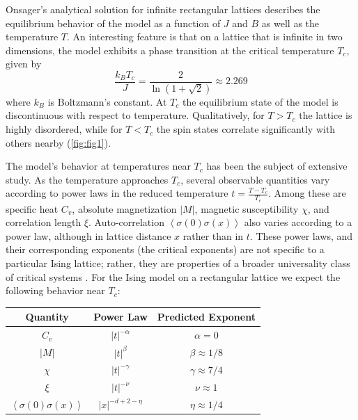 \documentclass[letter,scriptaddress,twocolumn, prl,nofootinbib]{revtex4}
\newcommand{\submin}[1]{\left\langle #1 \right\rangle}
\begin{document}
Onsager's analytical solution for infinite rectangular lattices \cite{Onsager} describes the equilibrium behavior of the model as a function of $J$ and $B$ as well as the temperature $T$. An interesting feature is that on a lattice that is infinite in two dimensions, the model exhibits a phase transition at the critical temperature $T_c$, given by
\begin{equation}
	\label{eq:Tc}
	\frac{k_B T_c}{J} = \frac{2}{\ln{(1+\sqrt{2})}} \approx 2.269
\end{equation}
where $k_B$ is Boltzmann's constant. At $T_c$ the equilibrium state of the model is discontinuous with respect to temperature. Qualitatively, for $T > T_c$ the lattice is highly disordered, while for $T < T_c$ the spin states correlate significantly with others nearby (\autoref{fig:fig1}).

The model's behavior at temperatures near $T_c$ has been the subject of extensive study. As the temperature approaches $T_c$, several observable quantities vary according to power laws in the reduced temperature $t = \frac{T - T_c}{T_c}$. Among these are specific heat $C_v$, absolute magnetization $|M|$, magnetic susceptibility $\chi$, and correlation length $\xi$. Auto-correlation $\submin{\sigma(0)\sigma(x)}$ also varies according to a power law, although in lattice distance $x$ rather than in $t$. These power laws, and their corresponding exponents (the critical exponents) are not specific to a particular Ising lattice; rather, they are properties of a broader universality class of critical systems \cite{Stanley}. For the Ising model on a rectangular lattice we expect the following behavior near $T_c$: %

	\begin{center}
		\begin{tabular}{|c|c|c|}
			\hline
			Quantity & Power Law & Predicted Exponent \\
			\hline
			$C_v$ & $|t|^{-\alpha}$ & $\alpha = 0$ \\
			$|M|$ & $|t|^\beta$ & $\beta \approx 1/8$ \\
			$\chi$ & $|t|^{-\gamma}$ & $\gamma \approx 7/4$ \\
			$\xi$ & $|t|^{-\nu}$ & $\nu \approx 1$ \\
			$\submin{\sigma(0)\sigma(x)}$ & $|x|^{-d + 2 - \eta}$ & $ \eta \approx 1/4$ \\
			\hline
		\end{tabular}
	\end{center}
\end{document}
